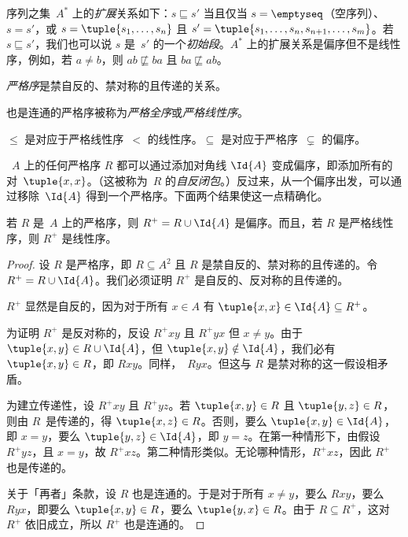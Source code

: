 \documentclass[../../../include/open-logic-section]{subfiles}
\begin{document}
\begin{ex}
序列之集~$A^*$ 上的\emph{扩展}关系如下：$s \sqsubseteq s'$ 当且仅当 $s = \emptyseq$（空序列）、$s = s'$，或 $s = \tuple{s_1, \dots, s_n}$ 且 $s' = \tuple{s_1, \dots, s_n, s_{n+1}, \dots, s_m}$。若 $s \sqsubseteq s'$，我们也可以说 $s$ 是~$s'$ 的一个\emph{初始段}。$A^*$ 上的扩展关系是偏序但不是线性序，例如，若 $a \neq b$，则 $ab \not\sqsubseteq ba$ 且 $ba \not\sqsubseteq ab$。
\end{ex}

\begin{defn}[严格序]
\emph{严格序}是禁自反的、禁对称的且传递的关系。
\end{defn}

\begin{defn}[严格线性序]
也是连通的严格序被称为\emph{严格全序}或\emph{严格线性序}。
\end{defn}

\begin{ex}
$\le$ 是对应于严格线性序~$<$ 的线性序。$\subseteq$ 是对应于严格序~$\subsetneq$ 的偏序。
\end{ex}

~$A$ 上的任何严格序 $R$ 都可以通过添加对角线 $\Id{A}$ 变成偏序，即添加所有的对~$\tuple{x, x}$。（这被称为~$R$ 的\emph{自反闭包}。）反过来，从一个偏序出发，可以通过移除~$\Id{A}$ 得到一个严格序。下面两个结果使这一点精确化。

\begin{prop}
若 $R$ 是~$A$ 上的严格序，则 $R^+ = R \cup \Id{A}$ 是偏序。而且，若 $R$ 是严格线性序，则 $R^+$ 是线性序。
\end{prop}

\begin{proof}
设 $R$ 是严格序，即 $R \subseteq A^2$ 且 $R$ 是禁自反的、禁对称的且传递的。令 $R^+ = R \cup \Id{A}$。我们必须证明 $R^+$ 是自反的、反对称的且传递的。

$R^+$ 显然是自反的，因为对于所有 $x \in A$ 有 $\tuple{x, x} \in \Id{A} \subseteq R^+$。

为证明 $R^+$ 是反对称的，反设 $R^+xy$ 且 $R^+yx$ 但 $x \neq y$。由于 $\tuple{x,y} \in R \cup \Id{A}$，但 $\tuple{x, y} \notin \Id{A}$，我们必有 $\tuple{x, y} \in R$，即 $Rxy$。同样，~$Ryx$。但这与 $R$ 是禁对称的这一假设相矛盾。

为建立传递性，设 $R^+xy$ 且 $R^+yz$。若 $\tuple{x, y} \in R$ 且 $\tuple{y,z} \in R$，则由 $R$~是传递的，得 $\tuple{x, z} \in R$。否则，要么 $\tuple{x, y} \in \Id{A}$，即 $x = y$，要么 $\tuple{y, z} \in \Id{A}$，即 $y = z$。在第一种情形下，由假设 $R^+yz$，且 $x = y$，故 $R^+xz$。第二种情形类似。无论哪种情形，$R^+xz$，因此 $R^+$ 也是传递的。

关于「再者」条款，设 $R$ 也是连通的。于是对于所有 $x \neq y$，要么 $Rxy$，要么~$Ryx$，即要么 $\tuple{x, y} \in R$，要么 $\tuple{y, x} \in R$。由于 $R \subseteq R^+$，这对 $R^+$ 依旧成立，所以 $R^+$ 也是连通的。
\end{proof}
\end{document}

